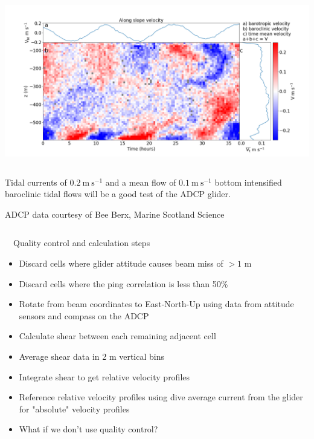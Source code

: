 \documentclass[unknownkeysallowed,usepdftitle=false]{beamer}
\newcommand{\secvariable}{nothing}
\newcommand{\mysection}[1]{\renewcommand{\secvariable}{#1}
}
\begin{document}
\begin{frame}\label{fsc_shear}
\vspace*{-10mm}    
\begin{center}
\includegraphics[trim=20 20 20 60,clip,width=\paperwidth]{figure/adcp_fsc.png}
\end{center}
\vspace*{-5mm}    
\begin{columns}
\begin{column}[t]{0.9\textwidth}
Tidal currents of $0.2\ \mathrm{m\ s^{-1}}$ and a mean flow of $0.1\ \mathrm{m\ s^{-1}}$ bottom intensified baroclinic tidal flows will be a good test of the ADCP glider.  

ADCP data courtesy of Bee Berx, Marine Scotland Science
\end{column}
\end{columns}
 
\end{frame}
\mysection{qc}
\begin{frame}\label{\secvariable}
\ \ Quality control  and calculation steps
\begin{itemize}
\item Discard cells where glider attitude causes beam miss of $> 1$ m \hyperlink{flight_envelope}{}
\item Discard cells where the ping correlation is less than 50\%
 \hyperlink{ping_corr}{}
\item Rotate from beam coordinates to East-North-Up using data from attitude sensors and compass on the ADCP
\item Calculate shear between each remaining adjacent cell
\item Average shear data in 2 m vertical bins
\item Integrate shear to get relative velocity profiles
\item Reference relative velocity profiles using dive average current from the glider for "absolute" velocity profiles
\item What if we don't use quality control? \hyperlink{no_qc}{}
\end{itemize}
\end{frame}
\end{document}
